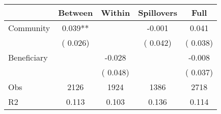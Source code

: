 
\begin{tabular}{l*{4}{c}}\hline&\multicolumn{1}{c}{Between}&\multicolumn{1}{c}{Within}&\multicolumn{1}{c}{Spillovers}&\multicolumn{1}{c}{Full}\\ \hline
 Community             &              0.039**      &                                               &       -0.001 &         0.041                            \\ 
                               &        (       0.026)           &                                       &       (       0.042)     &      (       0.038)                                           \\ 
 Beneficiary   &                                               &       -0.028    &                                &            -0.008                            \\ 
                               &                                               & (       0.048)                  &                                        &      (       0.037)                                           \\ 
\hline                                                                                                                                                                                                                                            
 Obs                   &               2126               &       1924                       &       1386                &              2718                                               \\ 
 R2                    &                      0.113              &              0.103                      &              0.136               &                     0.114                                              \\ 
\hline \end{tabular}                                                                                                                                                                                                              